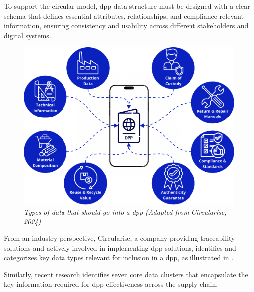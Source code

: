 To support the circular model, \ac{dpp} data structure must be designed with a clear schema that defines essential attributes, relationships, and compliance-relevant information, ensuring consistency and usability across different stakeholders and digital systems.

\begin{figure}[ht]
  \centering
  \includegraphics[width=\textwidth]{figures/dpp_data.pdf}
  \caption{%
    \textit{Types of data that should go into a \acrshort{dpp} (Adapted from Circularise, 2024)} 
  }
  \label{fig:dpp_data}
\end{figure}

From an industry perspective, Circularise, a company providing traceability solutions and actively involved in implementing \ac{dpp} solutions, identifies and categorizes key data types relevant for inclusion in a \ac{dpp}, as illustrated in . \autocite{Daphne.2024}

Similarly, recent research identifies seven core data clusters that encapsulate the key information required for \ac{dpp} effectiveness across the supply chain. \autocite{Jensen.2023}

